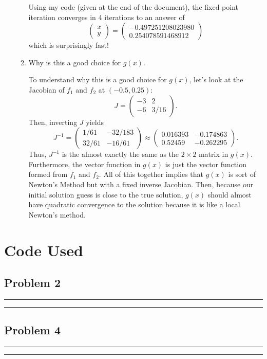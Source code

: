 \documentclass[a4paper,12pt]{article}
\newcommand{\pmat}[1]{\begin{pmatrix} #1 \end{pmatrix}}
\begin{document}
\begin{enumerate}[label = \arabic*)]
\begin{enumerate}[label = (\alph*)]
		Using my code (given at the end of the document), the fixed point iteration converges in 4 iterations to an answer of 
		\[
			\pmat{x \\ y} = \pmat{-0.497251208023980 \\ 0.254078591468912}
		\]
		 which is surprisingly fast! 
		
		\item Why is this a good choice for $ g(x) $.
		
		To understand why this is a good choice for $ g(x) $, let's look at the Jacobian of $ f_1 $ and $ f_2 $ at $ (-0.5, 0.25) $:
		\[
			J = \pmat{-3 & 2 \\ -6 & 3/16}.
		\]
		Then, inverting $ J $ yields
		\[
			J^{-1} = \pmat{1/61 & -32/183 \\ 32/61 & -16/61} \approx \pmat{0.016393 & -0.174863 \\ 0.52459 & -0.262295}.
		\]
		Thus, $ J^{-1} $ is the almost exactly the same as the $ 2 \times 2 $ matrix in $ g(x) $. Furthermore, the vector function in $ g(x) $ is just the vector function formed from $ f_1 $ and $ f_2 $. All of this together implies that $ g(x) $ is sort of Newton's Method but with a fixed inverse Jacobian. Then, because our initial solution guess is close to the true solution, $ g(x) $ should almost have quadratic convergence to the solution because it is like a local Newton's method.
	\end{enumerate}
\end{enumerate}

\newpage
\section*{Code Used}
\subsection*{Problem 2}
\rule{\textwidth}{0.4pt}
	
\rule{\textwidth}{0.4pt}

\newpage
\subsection*{Problem 4}
\rule{\textwidth}{0.4pt}
	
\rule{\textwidth}{0.4pt}
\end{document}
